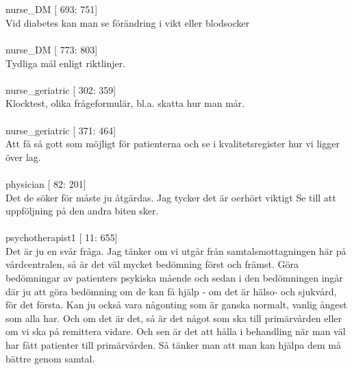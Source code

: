 \documentclass[12pt,a4paper,oneside]{article}
\begin{document}
\ \\\ \\
 nurse\_DM [ 693: 751]\\ 
Vid diabetes kan man se f{\"o}r{\"a}ndring i vikt eller blodsocker %
\ \\\ \\
 nurse\_DM [ 773: 803]\\ 
Tydliga m{\aa}l enligt riktlinjer. %
\ \\\ \\
 nurse\_geriatric [ 302: 359]\\ 
Klocktest, olika fr{\aa}geformul{\"a}r, bl.a. skatta hur man m{\aa}r. %
\ \\\ \\
 nurse\_geriatric [ 371: 464]\\ 
Att f{\aa} s{\aa} gott som m{\"o}jligt f{\"o}r patienterna och se i kvalitetsregister hur vi ligger {\"o}ver lag. %
\ \\\ \\
 physician [  82: 201]\\ 
Det de s{\"o}ker f{\"o}r m{\aa}ste ju {\aa}tg{\"a}rdas. Jag tycker det {\"a}r oerh{\"o}rt viktigt Se till att uppf{\"o}ljning p{\aa} den andra biten sker.  %
\ \\\ \\
 psychotherapist1 [  11: 655]\\ 
Det {\"a}r ju en sv{\aa}r fr{\aa}ga. Jag t{\"a}nker om vi utg{\aa}r fr{\aa}n samtalsmottagningen h{\"a}r p{\aa} v{\aa}rdcentralen, s{\aa} {\"a}r det v{\"a}l mycket bed{\"o}mning f{\"o}rst och fr{\"a}mst. G{\"o}ra bed{\"o}mningar av patienters psykiska m{\aa}ende och sedan i den bed{\"o}mningen ing{\aa}r d{\"a}r ju att g{\"o}ra bed{\"o}mning om de kan f{\aa} hj{\"a}lp - om det {\"a}r h{\"a}lso- och sjukv{\aa}rd, f{\"o}r det f{\"o}rsta. Kan ju ocks{\aa} vara n{\aa}gonting som {\"a}r ganska normalt, vanlig {\aa}ngest som alla har. Och om det {\"a}r det, s{\aa} {\"a}r det n{\aa}got som ska till prim{\"a}rv{\aa}rden eller om vi ska p{\aa} remittera vidare. Och sen {\"a}r det att h{\aa}lla i behandling n{\"a}r man v{\"a}l har f{\aa}tt patienter till prim{\"a}rv{\aa}rden. S{\aa} t{\"a}nker man att man kan hj{\"a}lpa dem m{\aa} b{\"a}ttre genom samtal. %
\end{document}
